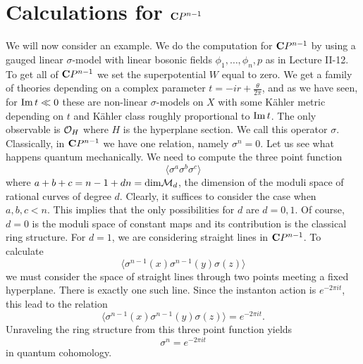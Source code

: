 \section{Calculations for ${\bf C}P^{n-1}$}

We will now consider an example.
We do the computation for ${\bf C}P^{n-1}$ by using a gauged linear
$\sigma$-model with linear bosonic fields $\phi_1,\ldots,\phi_n,p$ as
in Lecture II-12.
To get all of ${\bf C}P^{n-1}$ we set the superpotential $W$ equal to
zero.
We get a family of theories depending on a complex parameter
$t=-ir+\frac\theta{2\pi}$, and
as we have seen, for ${\rm Im}\,t\ll 0$ these are non-linear
$\sigma$-models on $X$ with some K\"ahler metric depending on $t$ and
K\"ahler class roughly proportional to ${\rm Im}\,t$.
The only observable is ${\cal O}_H$ where $H$ is the hyperplane
section. We call this operator $\sigma$.
Classically, in ${\bf C}P^{n-1}$ we have one relation, namely
$\sigma^{n}=0$. Let us see what happens quantum mechanically.
We need to compute the three point function
$$\langle \sigma^a\sigma^b\sigma^c\rangle$$
where $a+b+c=n-1+dn={\rm dim}{\cal M}_d$,
the dimension of the moduli space of rational curves of degree $d$.
Clearly, it suffices to consider the case when $a,b,c<n$. This implies
that the only possibilities for $d$ are $d=0,1$. Of course, $d=0$
is the moduli space of constant maps and its contribution is the
classical ring structure. For $d=1$, we are considering
straight lines in ${\bf C}P^{n-1}$.
To calculate
$$\langle \sigma^{n-1}(x)\sigma^{n-1}(y)\sigma(z)\rangle$$
we must consider the space of straight lines through two points
meeting a fixed hyperplane. There is exactly one such line.
Since the instanton action is $e^{-2\pi it}$,
this lead to the relation
$$\langle \sigma^{n-1}(x)\sigma^{n-1}(y)\sigma(z)\rangle= e^{-2\pi
it}.$$
Unraveling the ring structure from this three point function yields
$$\sigma^n=e^{-2\pi it}$$
in quantum cohomology.

